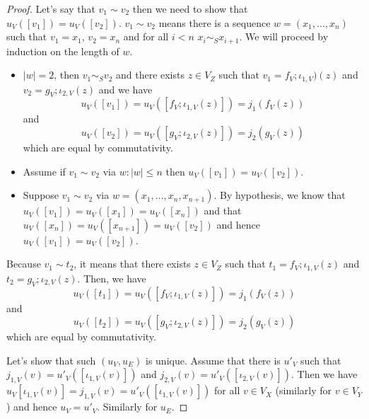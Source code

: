 \begin{proof}
    Let's say that $v_1 \sim v_2$ then we need to show that $u_{V}([v_1]) = u_{V}([v_2])$.
    $v_1 \sim v_2$ means there is a sequence $w = (x_1, \ldots, x_n)$ such that $v_1 = x_1$, $v_2 = x_n$ and for all $i < n$ $x_i \sim_{S} x_{i+1}$. We will proceed by induction on the length of $w$.
    \begin{itemize}
        \item $|w| = 2$, then $v_1 \sim_{S} v_2$ and there exists $z \in V_{Z}$ such that $v_1 = f_{V};\iota_{1,V})(z)$ and $v_2 = g_{V};\iota_{2,V}(z)$ and we have
        \[
            u_{V}([v_1]) = u_{V}([f_{V};\iota_{1,V}(z)]) = j_1({f_{V}(z)})
        \] 
        and 
        \[
            u_{V}([v_2]) = u_{V}([g_{V};\iota_{2,V}(z)]) = j_{2}(g_{V}(z))
        \] 
        which are equal by commutativity.
        \item Assume if $v_1 \sim v_2$ via $w : |w| \leq n$ then $u_{V}([v_1]) = u_{V}([v_2])$.
        \item Suppose $v_1 \sim v_2$ via $w = (x_1, \ldots, x_n, x_{n+1})$.
              By hypothesis, we know that $u_{V}([v_1]) = u_{V}([x_1]) = u_{V}([x_n])$ and that $u_{V}([x_n]) = u_{V}([x_{n+1}]) = u_{V}([v_2])$ and hence $u_{V}([v_1]) = u_{V}([v_2])$.
    \end{itemize}
    Because $v_1 \sim t_2$, it means that there exists $z \in V_{Z}$ such that $t_1 = f_{V};\iota_{1,V}(z)$ and $t_2 = g_{V};\iota_{2,V}(z)$.
    Then, we have
    \[
    u_{V}([t_1]) = u_{V}([f_{V};\iota_{1,V}(z)]) = j_1({f_{V}(z)})
    \] and 
    \[
    u_{V}([t_2]) = u_{V}([g_{V};\iota_{2,V}(z)]) = j_{2}(g_{V}(z))
    \] which are equal by commutativity.

    Let's show that such $(u_{V},u_{E})$ is unique.
    Assume that there is $u'_{V}$ such that $j_{1,V}(v) = u'_{V}([\iota_{1,V}(v)])$ and $j_{2,V}(v) = u'_{V}([\iota_{2,V}(v)])$.
    Then we have $u_{V}[\iota_{1,V}(v)] = j_{1,V}(v) = u'_{V}([\iota_{1,V}(v)])$ for all $v \in V_{X}$ (similarly for $v \in V_{Y}$) and hence $u_{V} = u'_{V}$.
    Similarly for $u_{E}$.


\end{proof}
